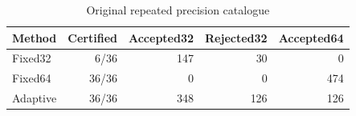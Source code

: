 \begin{table}[htbp]
\centering\small
\caption{Original repeated precision catalogue}
\label{tab:precision}
\begin{tabular}{lrrrr}
\toprule
Method & Certified & Accepted32 & Rejected32 & Accepted64\\
\midrule
Fixed32 & 6/36 & 147 & 30 & 0\\
Fixed64 & 36/36 & 0 & 0 & 474\\
Adaptive & 36/36 & 348 & 126 & 126\\
\bottomrule
\end{tabular}
\end{table}
